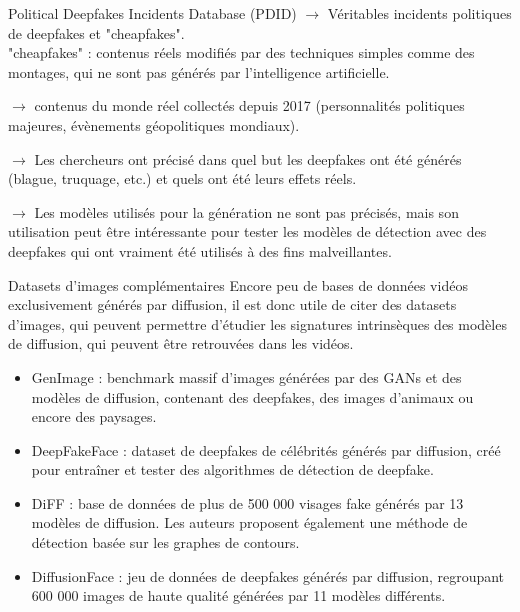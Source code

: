 \documentclass[10pt,aspectratio=169]{beamer}
\begin{document}
\begin{frame}{Political Deepfakes Incidents Database (PDID) \citep{walker}}
    $\to$ Véritables incidents politiques de deepfakes et "cheapfakes". \\
    "cheapfakes" : contenus réels modifiés par des techniques simples comme des montages, qui ne sont pas générés par l'intelligence artificielle.

    \bigskip 

    $\to$ contenus du monde réel collectés depuis 2017 (personnalités politiques majeures, évènements géopolitiques mondiaux).

    \bigskip

    $\to$ Les chercheurs ont précisé dans quel but les deepfakes ont été générés (blague, truquage, etc.) et quels ont été leurs effets réels.

    \bigskip 

    $\to$ Les modèles utilisés pour la génération ne sont pas précisés, mais son utilisation peut être intéressante pour tester les modèles de détection avec des deepfakes qui ont vraiment été utilisés à des fins malveillantes.
\end{frame}

\begin{frame}{Datasets d'images complémentaires}
    Encore peu de bases de données vidéos exclusivement générés par diffusion, il est donc utile de citer des datasets d'images, qui peuvent permettre d’étudier les signatures intrinsèques des modèles de diffusion, qui peuvent être retrouvées dans les vidéos.

    \bigskip

    \begin{itemize}
        \item GenImage \citep{zhu2023genimage} : benchmark massif d'images générées par des GANs et des modèles de diffusion, contenant des deepfakes, des images d'animaux ou encore des paysages.
        \item DeepFakeFace \citep{song} : dataset de deepfakes de célébrités générés par diffusion, créé pour entraîner et tester des algorithmes de détection de deepfake.
        \item DiFF \citep{cheng} : base de données de plus de 500 000 visages fake générés par 13 modèles de diffusion. Les auteurs proposent également une méthode de détection basée sur les graphes de contours.
        \item DiffusionFace \citep{chen} : jeu de données de deepfakes générés par diffusion, regroupant 600 000 images de haute qualité générées par 11 modèles différents.
    \end{itemize}
\end{frame}
\end{document}
